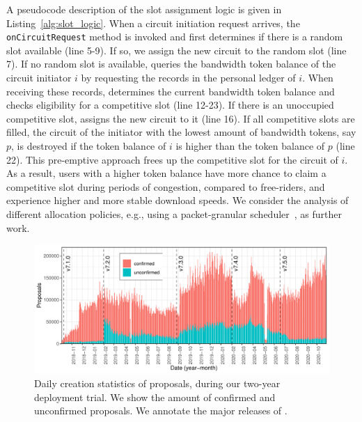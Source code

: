 A pseudocode description of the slot assignment logic is given in Listing~\ref{alg:slot_logic}.
When a circuit initiation request arrives, the \texttt{onCircuitRequest} method is invoked and \Tribler{} first determines if there is a random slot available (line 5-9).
If so, we assign the new circuit to the random slot (line 7).
If no random slot is available, \Tribler{} queries the bandwidth token balance of the circuit initiator $ i $ by requesting the records in the personal ledger of $ i $.
When receiving these records, \Tribler{} determines the current bandwidth token balance and checks eligibility for a competitive slot (line 12-23).
If there is an unoccupied competitive slot, \Tribler{} assigns the new circuit to it (line 16).
If all competitive slots are filled, the circuit of the initiator with the lowest amount of bandwidth tokens, say $ p $, is destroyed if the token balance of $ i $ is higher than the token balance of $ p $ (line 22).
This pre-emptive approach frees up the competitive slot for the circuit of $ i $.
As a result, users with a higher token balance have more chance to claim a competitive slot during periods of congestion, compared to free-riders, and experience higher and more stable download speeds.
We consider the analysis of different allocation policies, e.g., using a packet-granular scheduler~\cite{jansen2018kist}, as further work.


\begin{figure}[!t]
	\centering
	\includegraphics[width=\linewidth]{trustchain/assets/record_creation}
	\caption{Daily creation statistics of proposals, during our two-year deployment trial. We show the amount of confirmed and unconfirmed proposals. We annotate the major releases of \Tribler{}.}
	\label{fig:record_creation}
\end{figure}

